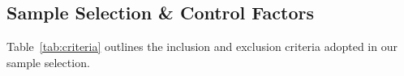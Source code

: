 \subsection{Sample Selection \& Control Factors}
\label{sec:control-framework}
Table~\ref{tab:criteria} outlines the inclusion and exclusion criteria adopted in our sample selection.
%
%
